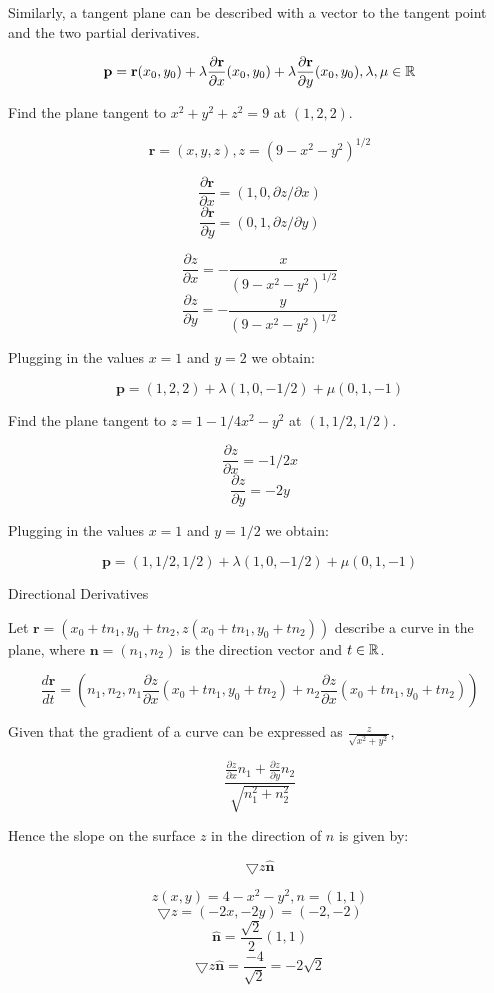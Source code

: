 \documentclass[a4paper,10pt]{article}
\begin{document}
Similarly, a tangent plane can be described with a vector to the tangent point
and the two partial derivatives.

\[ \mathbf{p} = \mathbf{r}(x_0, y_0)
+ \lambda \frac{\partial \mathbf{r}}{\partial x}(x_0, y_0)
+ \lambda \frac{\partial \mathbf{r}}{\partial y}(x_0, y_0)
, \lambda, \mu \in \mathbb{R} \]

\begin{ex}
	Find the plane tangent to $x^2 + y^2 + z^2 = 9$ at $(1,2,2)$.

	\[ \mathbf{r} = (x,y,z), z = (9 - x^2 - y^2)^{1/2} \]

	\[ \frac{\partial \mathbf{r}}{\partial x} = (1, 0, \partial z /
	\partial x) \]
	\[ \frac{\partial \mathbf{r}}{\partial y} = (0, 1, \partial z /
	\partial y) \]

	\[ \frac{\partial z}{\partial x} = - \frac{x}{(9-x^2-y^2)^{1/2}} \]
	\[ \frac{\partial z}{\partial y} = - \frac{y}{(9-x^2-y^2)^{1/2}} \]

	Plugging in the values $x=1$ and $y=2$ we obtain:

	\[ \mathbf{p} = (1,2,2) + \lambda (1, 0, -1/2) + \mu (0, 1, -1) \]
\end{ex}

\begin{ex}
	Find the plane tangent to $z = 1 - 1/4 x^2 - y^2$ at $(1,1/2,1/2)$.

	\[ \frac{\partial z}{\partial x} = -1/2 x \]
	\[ \frac{\partial z}{\partial y} = -2y \]

	Plugging in the values $x=1$ and $y=1/2$ we obtain:

	\[ \mathbf{p} = (1,1/2,1/2) + \lambda (1, 0, -1/2) + \mu (0, 1, -1) \]
\end{ex}

Directional Derivatives

Let $\mathbf{r} = \left(x_0 + tn_1, y_0 + tn_2, z(x_0 + tn_1, y_0 +
tn_2)\right)$ describe a curve in the plane, where $\mathbf{n} = (n_1, n_2)$ is
the direction vector and $t \in \mathbb{R}$.

\[ \frac{d\mathbf{r}}{dt} = \left(n_1, n_2, n_1 \frac{\partial z}{\partial x}
(x_0 + tn_1, y_0 + tn_2) + n_2 \frac{\partial z}{\partial x} (x_0 + tn_1, y_0 +
tn_2)\right) \]

Given that the gradient of a curve can be expressed as $\frac{z}{\sqrt{x^2 +
y^2}}$,

\[ \frac{\frac{\partial z}{\partial x} n_1 + \frac{\partial z}{\partial y}
n_2}{\sqrt{n_1^2 + n_2^2}} \]

Hence the slope on the surface $z$ in the direction of $n$ is given by:

\[ \bigtriangledown z \mathbf{\hat{n}} \]

\begin{ex}
	\[ z(x,y) = 4 - x^2 - y^2, n = (1,1) \]
	\[ \bigtriangledown z = (-2x, -2y) = (-2, -2) \]
	\[ \mathbf{\hat{n}} = \frac{\sqrt{2}}{2} (1,1) \]
	\[ \bigtriangledown z \mathbf{\hat{n}} = \frac{-4}{\sqrt{2}}
	   = -2 \sqrt{2} \]
\end{ex}
\end{document}
